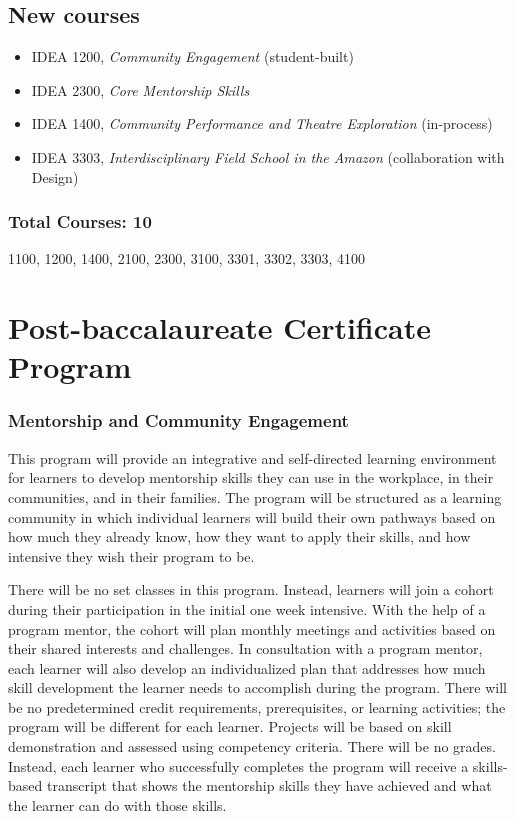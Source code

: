 \documentclass[letterpaper,10pt,headsepline]{scrreprt}
\begin{document}
\subsection{New courses}

\begin{itemize}
\itemsep1pt\parskip0pt
\item
  IDEA 1200, \emph{Community Engagement} (student-built)
\item
  IDEA 2300, \emph{Core Mentorship Skills}
\item
  IDEA 1400, \emph{Community Performance and Theatre Exploration}
  (in-process)
\item
  IDEA 3303, \emph{Interdisciplinary Field School in the Amazon}
  (collaboration with Design)
\end{itemize}

\subsubsection{Total Courses: 10}

1100, 1200, 1400, 2100, 2300, 3100, 3301, 3302, 3303, 4100

\section{Post-baccalaureate Certificate Program}

\subsubsection{Mentorship and Community Engagement}

This program will provide an integrative and self-directed learning
environment for learners to develop mentorship skills they can use in
the workplace, in their communities, and in their families. The program
will be structured as a learning community in which individual learners
will build their own pathways based on how much they already know, how
they want to apply their skills, and how intensive they wish their
program to be.

There will be no set classes in this program. Instead, learners will
join a cohort during their participation in the initial one week
intensive. With the help of a program mentor, the cohort will plan
monthly meetings and activities based on their shared interests and
challenges. In consultation with a program mentor, each learner will
also develop an individualized plan that addresses how much skill
development the learner needs to accomplish during the program. There
will be no predetermined credit requirements, prerequisites, or learning
activities; the program will be different for each learner. Projects
will be based on skill demonstration and assessed using competency
criteria. There will be no grades. Instead, each learner who
successfully completes the program will receive a skills-based
transcript that shows the mentorship skills they have achieved and what
the learner can do with those skills.
\end{document}
